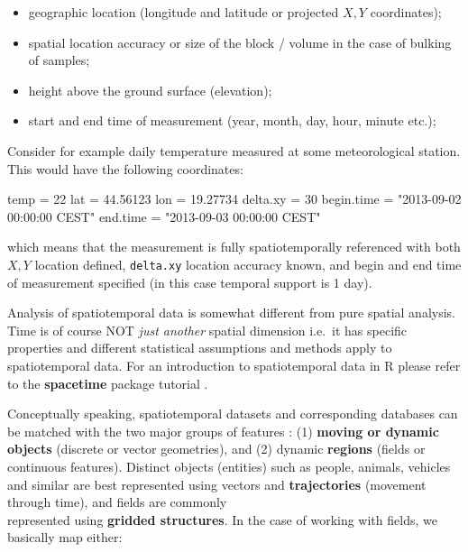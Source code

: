 \documentclass[
  graybox,natbib,nospthms]{svmono}
\newenvironment{Shaded}{\begin{snugshade}}{\end{snugshade}}
\newcommand{\DecValTok}[1]{\textcolor[rgb]{0.06,0.06,0.06}{#1}}
\newcommand{\FloatTok}[1]{\textcolor[rgb]{0.06,0.06,0.06}{#1}}
\newcommand{\NormalTok}[1]{#1}
\newcommand{\OtherTok}[1]{\textcolor[rgb]{0.37,0.37,0.37}{#1}}
\newcommand{\StringTok}[1]{\textcolor[rgb]{0.5,0.5,0.5}{#1}}
\providecommand{\tightlist}{%
  \setlength{\itemsep}{0pt}\setlength{\parskip}{0pt}}
\providecommand{\tightlist}{\setlength{\itemsep}{0pt}\setlength{\parskip}{0pt}}
\begin{document}
\begin{itemize}
\tightlist
\item
  geographic location (longitude and latitude or projected \(X,Y\) coordinates);\\
\item
  spatial location accuracy or size of the block / volume in the case of bulking of samples;\\
\item
  height above the ground surface (elevation);\\
\item
  start and end time of measurement (year, month, day, hour, minute etc.);
\end{itemize}

Consider for example daily temperature measured at some meteorological station.
This would have the following coordinates:

\begin{Shaded}
\begin{Highlighting}[]
\NormalTok{temp }\OtherTok{=} \DecValTok{22}
\NormalTok{lat }\OtherTok{=} \FloatTok{44.56123}
\NormalTok{lon }\OtherTok{=} \FloatTok{19.27734}
\NormalTok{delta.xy }\OtherTok{=} \DecValTok{30}
\NormalTok{begin.time }\OtherTok{=} \StringTok{"2013{-}09{-}02 00:00:00 CEST"}
\NormalTok{end.time }\OtherTok{=} \StringTok{"2013{-}09{-}03 00:00:00 CEST"}
\end{Highlighting}
\end{Shaded}

which means that the measurement is fully spatiotemporally referenced with
both \(X,Y\) location defined, \texttt{delta.xy} location accuracy known, and begin and
end time of measurement specified (in this case temporal support is 1 day).

Analysis of spatiotemporal data is somewhat different from pure spatial
analysis. Time is of course NOT \emph{just another} spatial dimension i.e.~it has
specific properties and different statistical assumptions and methods apply to
spatiotemporal data. For an introduction to spatiotemporal data in R please
refer to the \textbf{spacetime} package tutorial \citep{pebesma2012spacetime}.

Conceptually speaking, spatiotemporal datasets and corresponding
databases can be matched with the two major groups of features \citep{erwig1999spatio}: (1)
\textbf{moving or dynamic objects} (discrete or vector geometries), and (2)
dynamic \textbf{regions} (fields or continuous features). Distinct objects (entities)
such as people, animals, vehicles and similar are best represented using
vectors and \textbf{trajectories} (movement through time), and fields are commonly\\
represented using \textbf{gridded structures}. In the case of working with
fields, we basically map either:
\end{document}
